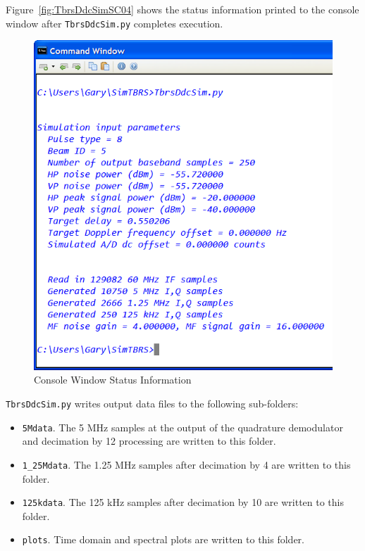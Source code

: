 \documentclass[12pt,english]{article}
\begin{document}
Figure~\vref{fig:TbrsDdcSimSC04} shows the status information printed
to the console window after \texttt{TbrsDdcSim.py} completes
execution.
\begin{figure}[ht]
  \noindent \begin{centering}
  \includegraphics{TbrsDdcSimSC04.png}\medskip{}
  \caption{Console Window Status Information}
  \label{fig:TbrsDdcSimSC04}
  \par \end{centering}
\end{figure}

\texttt{TbrsDdcSim.py} writes output data files to the following
sub-folders:
\begin{itemize}

\item \texttt{5Mdata}. The 5 MHz samples at the output of the
quadrature demodulator and decimation by 12 processing are written to
this folder.

\item \texttt{1\_25Mdata}. The 1.25 MHz samples after decimation by 4
are written to this folder.

\item \texttt{125kdata}. The 125 kHz samples after decimation by 10
are written to this folder.

\item \texttt{plots}. Time domain and spectral plots are written to
this folder.


\end{itemize}
\end{document}

